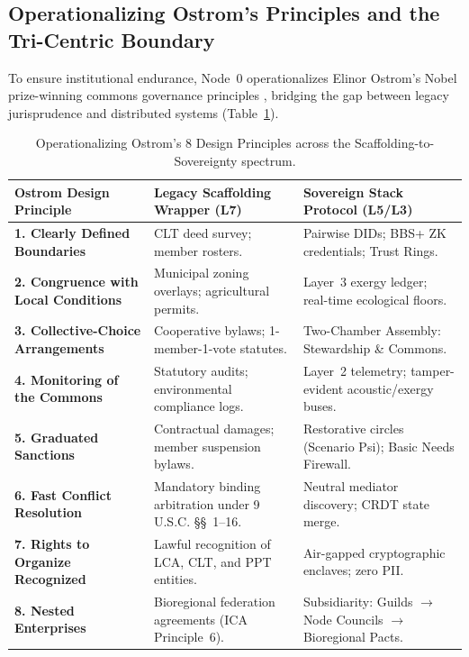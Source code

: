 \subsection{Operationalizing Ostrom's Principles and the Tri-Centric Boundary}
\label{subsec:ostrom_tricentric}

To ensure institutional endurance, Node~0 operationalizes Elinor Ostrom's Nobel prize-winning commons governance principles \parencite{ostrom1990}, bridging the gap between legacy jurisprudence and distributed systems (Table~\ref{tab:ostrom_evolution}).

\begin{table}[htbp]
\centering
\small
\setlength{\tabcolsep}{3.5pt}
\begin{tabular}{|p{}|p{}|p{}|}
\hline
\textbf{Ostrom Design Principle} & \textbf{Legacy Scaffolding Wrapper (L7)} & \textbf{Sovereign Stack Protocol (L5/L3)} \\
\hline
\textbf{1. Clearly Defined Boundaries} & CLT deed survey; member rosters. & Pairwise DIDs; BBS+ ZK credentials; Trust Rings. \\
\hline
\textbf{2. Congruence with Local Conditions} & Municipal zoning overlays; agricultural permits. & Layer~3 exergy ledger; real-time ecological floors. \\
\hline
\textbf{3. Collective-Choice Arrangements} & Cooperative bylaws; 1-member-1-vote statutes. & Two-Chamber Assembly: Stewardship \& Commons. \\
\hline
\textbf{4. Monitoring of the Commons} & Statutory audits; environmental compliance logs. & Layer~2 telemetry; tamper-evident acoustic/exergy buses. \\
\hline
\textbf{5. Graduated Sanctions} & Contractual damages; member suspension bylaws. & Restorative circles (Scenario Psi); Basic Needs Firewall. \\
\hline
\textbf{6. Fast Conflict Resolution} & Mandatory binding arbitration under 9 U.S.C. \S\S~1--16. & Neutral mediator discovery; CRDT state merge. \\
\hline
\textbf{7. Rights to Organize Recognized} & Lawful recognition of LCA, CLT, and PPT entities. & Air-gapped cryptographic enclaves; zero PII. \\
\hline
\textbf{8. Nested Enterprises} & Bioregional federation agreements (ICA Principle~6). & Subsidiarity: Guilds $\to$ Node Councils $\to$ Bioregional Pacts. \\
\hline
\end{tabular}
\caption{Operationalizing Ostrom's 8 Design Principles across the Scaffolding-to-Sovereignty spectrum.}
\label{tab:ostrom_evolution}
\end{table}

